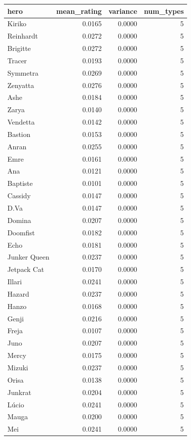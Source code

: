 \begin{tabular}{lrrr}
\toprule
hero & mean_rating & variance & num_types \\
\midrule
Kiriko & 0.0165 & 0.0000 & 5 \\
Reinhardt & 0.0272 & 0.0000 & 5 \\
Brigitte & 0.0272 & 0.0000 & 5 \\
Tracer & 0.0193 & 0.0000 & 5 \\
Symmetra & 0.0269 & 0.0000 & 5 \\
Zenyatta & 0.0276 & 0.0000 & 5 \\
Ashe & 0.0184 & 0.0000 & 5 \\
Zarya & 0.0140 & 0.0000 & 5 \\
Vendetta & 0.0142 & 0.0000 & 5 \\
Bastion & 0.0153 & 0.0000 & 5 \\
Anran & 0.0255 & 0.0000 & 5 \\
Emre & 0.0161 & 0.0000 & 5 \\
Ana & 0.0121 & 0.0000 & 5 \\
Baptiste & 0.0101 & 0.0000 & 5 \\
Cassidy & 0.0147 & 0.0000 & 5 \\
D.Va & 0.0147 & 0.0000 & 5 \\
Domina & 0.0207 & 0.0000 & 5 \\
Doomfist & 0.0182 & 0.0000 & 5 \\
Echo & 0.0181 & 0.0000 & 5 \\
Junker Queen & 0.0237 & 0.0000 & 5 \\
Jetpack Cat & 0.0170 & 0.0000 & 5 \\
Illari & 0.0241 & 0.0000 & 5 \\
Hazard & 0.0237 & 0.0000 & 5 \\
Hanzo & 0.0168 & 0.0000 & 5 \\
Genji & 0.0216 & 0.0000 & 5 \\
Freja & 0.0107 & 0.0000 & 5 \\
Juno & 0.0207 & 0.0000 & 5 \\
Mercy & 0.0175 & 0.0000 & 5 \\
Mizuki & 0.0237 & 0.0000 & 5 \\
Orisa & 0.0138 & 0.0000 & 5 \\
Junkrat & 0.0204 & 0.0000 & 5 \\
Lúcio & 0.0241 & 0.0000 & 5 \\
Mauga & 0.0200 & 0.0000 & 5 \\
Mei & 0.0241 & 0.0000 & 5 \\

\end{tabular}
